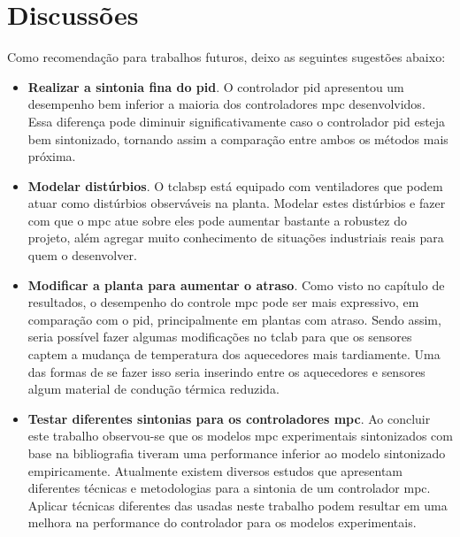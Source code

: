 \chapter{Discussões}
\label{ch:discussoes}

Como recomendação para trabalhos futuros, deixo as seguintes sugestões abaixo:

\begin{itemize}
	\item \textbf{Realizar a sintonia fina do \acrshort{pid}}. O controlador \acrshort{pid} apresentou um
			desempenho bem inferior a maioria dos controladores \acrshort{mpc} desenvolvidos. Essa diferença
			pode diminuir significativamente caso o controlador \acrshort{pid} esteja bem sintonizado, tornando
			assim a comparação entre ambos os métodos mais próxima.
	\item \textbf{Modelar distúrbios}. O \acrshort{tclabsp} está equipado com ventiladores que podem
			atuar como distúrbios observáveis na planta. Modelar estes distúrbios e fazer com que o \acrshort{mpc}
			atue sobre eles pode aumentar bastante a robustez do projeto, além agregar muito conhecimento de
			situações industriais reais para quem o desenvolver.
	\item \textbf{Modificar a planta para aumentar o atraso}. Como visto no capítulo de resultados, o desempenho do
			controle \acrshort{mpc} pode ser mais expressivo, em comparação com o \acrshort{pid}, principalmente em
			plantas com atraso. Sendo assim, seria possível fazer algumas modificações no \acrshort{tclab} para que
			os sensores captem a mudança de temperatura dos aquecedores mais tardiamente. Uma das formas de se fazer
			isso seria inserindo entre os aquecedores e sensores algum material de condução térmica reduzida.
	\item \textbf{Testar diferentes sintonias para os controladores \acrshort{mpc}}. Ao concluir este trabalho
			observou-se que os modelos \acrshort{mpc} experimentais sintonizados com base na bibliografia
			tiveram uma performance inferior ao modelo sintonizado empiricamente. Atualmente existem diversos estudos
			que apresentam diferentes técnicas e metodologias para a sintonia de um controlador \acrshort{mpc}.
			Aplicar técnicas diferentes das usadas neste trabalho podem resultar em uma melhora na performance
			do controlador para os modelos experimentais.
\end{itemize}